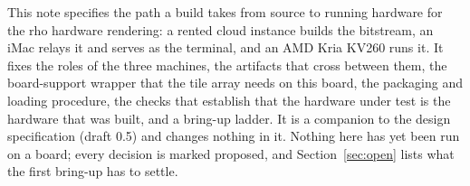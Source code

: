 This note specifies the path a build takes from source to running hardware
for the rho hardware rendering: a rented cloud instance builds the
bitstream, an iMac relays it and serves as the terminal, and an AMD Kria
KV260 runs it. It fixes the roles of the three machines, the artifacts that
cross between them, the board-support wrapper that the tile array needs on
this board, the packaging and loading procedure, the checks that establish
that the hardware under test is the hardware that was built, and a bring-up
ladder. It is a companion to the design specification (draft 0.5) and
changes nothing in it. Nothing here has yet been run on a board; every
decision is marked proposed, and Section~\ref{sec:open} lists what the first
bring-up has to settle.
